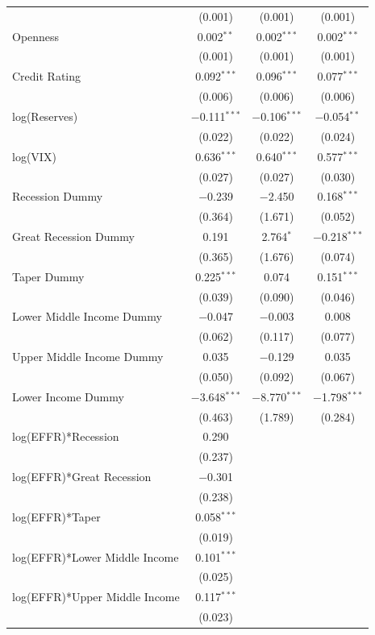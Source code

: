 \documentclass[12pt]{article}
\begin{document}
\begin{table}[!h]
\begin{tabular}{@{\extracolsep{5pt}}lccc}
  & (0.001) & (0.001) & (0.001) \\ 
  Openness & 0.002$^{**}$ & 0.002$^{***}$ & 0.002$^{***}$ \\ 
  & (0.001) & (0.001) & (0.001) \\ 
  Credit Rating & 0.092$^{***}$ & 0.096$^{***}$ & 0.077$^{***}$ \\ 
  & (0.006) & (0.006) & (0.006) \\ 
  log(Reserves) & $-$0.111$^{***}$ & $-$0.106$^{***}$ & $-$0.054$^{**}$ \\ 
  & (0.022) & (0.022) & (0.024) \\ 
  log(VIX) & 0.636$^{***}$ & 0.640$^{***}$ & 0.577$^{***}$ \\ 
  & (0.027) & (0.027) & (0.030) \\ 
  Recession Dummy & $-$0.239 & $-$2.450 & 0.168$^{***}$ \\ 
  & (0.364) & (1.671) & (0.052) \\ 
  Great Recession Dummy & 0.191 & 2.764$^{*}$ & $-$0.218$^{***}$ \\ 
  & (0.365) & (1.676) & (0.074) \\ 
  Taper Dummy & 0.225$^{***}$ & 0.074 & 0.151$^{***}$ \\ 
  & (0.039) & (0.090) & (0.046) \\ 
  Lower Middle Income Dummy & $-$0.047 & $-$0.003 & 0.008 \\ 
  & (0.062) & (0.117) & (0.077) \\ 
  Upper Middle Income Dummy & 0.035 & $-$0.129 & 0.035 \\ 
  & (0.050) & (0.092) & (0.067) \\ 
  Lower Income Dummy & $-$3.648$^{***}$ & $-$8.770$^{***}$ & $-$1.798$^{***}$ \\ 
  & (0.463) & (1.789) & (0.284) \\ 
  log(EFFR)*Recession & 0.290 &  &  \\ 
  & (0.237) &  &  \\ 
  log(EFFR)*Great Recession & $-$0.301 &  &  \\ 
  & (0.238) &  &  \\ 
  log(EFFR)*Taper & 0.058$^{***}$ &  &  \\ 
  & (0.019) &  &  \\ 
  log(EFFR)*Lower Middle Income & 0.101$^{***}$ &  &  \\ 
  & (0.025) &  &  \\ 
  log(EFFR)*Upper Middle Income & 0.117$^{***}$ &  &  \\ 
  & (0.023) &  &  \\ 

\end{tabular}
\end{table}
\end{document}
